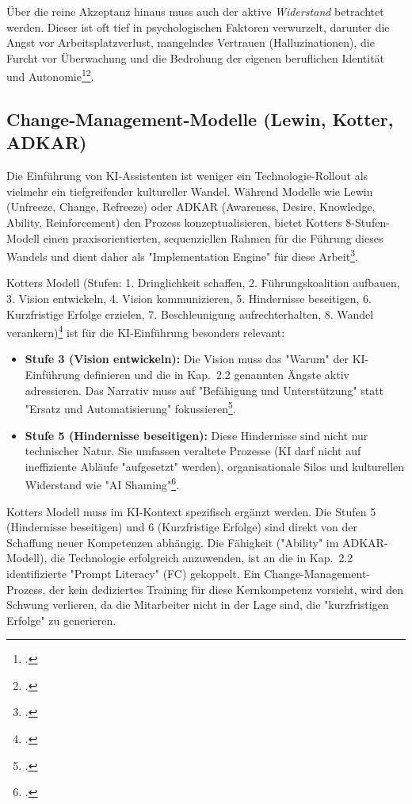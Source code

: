 \documentclass[12pt,a4paper,oneside]{article} %
\begin{document}
Über die reine Akzeptanz hinaus muss auch der aktive \textit{Widerstand} betrachtet werden. Dieser ist oft tief in psychologischen Faktoren verwurzelt, darunter die Angst vor Arbeitsplatzverlust, mangelndes Vertrauen (Halluzinationen), die Furcht vor Überwachung und die Bedrohung der eigenen beruflichen Identität und Autonomie\footcite{CyberSecurityIntel2025EmployeeResistance}\footcite{Pandatron2025OvercomingResistance}.

\subsection{Change-Management-Modelle (Lewin, Kotter, ADKAR)}
Die Einführung von KI-Assistenten ist weniger ein Technologie-Rollout als vielmehr ein tiefgreifender kultureller Wandel. Während Modelle wie Lewin (Unfreeze, Change, Refreeze) oder ADKAR (Awareness, Desire, Knowledge, Ability, Reinforcement) den Prozess konzeptualisieren, bietet Kotters 8-Stufen-Modell einen praxisorientierten, sequenziellen Rahmen für die Führung dieses Wandels und dient daher als "Implementation Engine" für diese Arbeit\footcite{Prosci2025KotterTheory}.

Kotters Modell (Stufen: 1. Dringlichkeit schaffen, 2. Führungskoalition aufbauen, 3. Vision entwickeln, 4. Vision kommunizieren, 5. Hindernisse beseitigen, 6. Kurzfristige Erfolge erzielen, 7. Beschleunigung aufrechterhalten, 8. Wandel verankern)\footcite{Splunk2025Kotter8Steps} ist für die KI-Einführung besonders relevant:

\begin{itemize}
    \item \textbf{Stufe 3 (Vision entwickeln):} Die Vision muss das "Warum" der KI-Einführung definieren und die in Kap.~2.2 genannten Ängste aktiv adressieren. Das Narrativ muss auf "Befähigung und Unterstützung" statt "Ersatz und Automatisierung" fokussieren\footcite{UPC2025AIProfessionalWorld}.
    \item \textbf{Stufe 5 (Hindernisse beseitigen):} Diese Hindernisse sind nicht nur technischer Natur. Sie umfassen veraltete Prozesse (KI darf nicht auf ineffiziente Abläufe "aufgesetzt" werden), organisationale Silos und kulturellen Widerstand wie "AI Shaming"\footcite{SloanReview2025ScaleGenAI}.
\end{itemize}

Kotters Modell muss im KI-Kontext spezifisch ergänzt werden. Die Stufen 5 (Hindernisse beseitigen) und 6 (Kurzfristige Erfolge) sind direkt von der Schaffung neuer Kompetenzen abhängig. Die Fähigkeit ("Ability" im ADKAR-Modell), die Technologie erfolgreich anzuwenden, ist an die in Kap.~2.2 identifizierte "Prompt Literacy" (FC) gekoppelt. Ein Change-Management-Prozess, der kein dediziertes Training für diese Kernkompetenz vorsieht, wird den Schwung verlieren, da die Mitarbeiter nicht in der Lage sind, die "kurzfristigen Erfolge" zu generieren.
\end{document}

